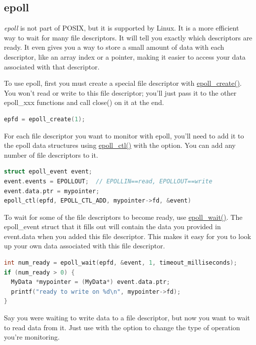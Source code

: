 \subsection{epoll}

\emph{epoll} is not part of POSIX, but it is supported by Linux.
It is a more efficient way to wait for many file descriptors.
It will tell you exactly which descriptors are ready.
It even gives you a way to store a small amount of data with each descriptor, like an array index or a pointer, making it easier to access your data associated with that descriptor.

To use epoll, first you must create a special file descriptor with \href{http://linux.die.net/man/2/epoll_create}{epoll\_create()}.
You won't read or write to this file descriptor; you'll just pass it to the other epoll\_xxx functions and call close() on it at the end.

\begin{lstlisting}[language=C]
    epfd = epoll_create(1);
\end{lstlisting}

For each file descriptor you want to monitor with epoll, you'll need to add it to the epoll data structures using \href{http://linux.die.net/man/2/epoll_ctl}{epoll\_ctl()} with the  option.
You can add any number of file descriptors to it.

\begin{lstlisting}[language=C]
struct epoll_event event;
event.events = EPOLLOUT;  // EPOLLIN==read, EPOLLOUT==write
event.data.ptr = mypointer;
epoll_ctl(epfd, EPOLL_CTL_ADD, mypointer->fd, &event)
\end{lstlisting}

To wait for some of the file descriptors to become ready, use \href{http://linux.die.net/man/2/epoll_wait}{epoll\_wait()}.
The epoll\_event struct that it fills out will contain the data you provided in event.data when you added this file descriptor.
This makes it easy for you to look up your own data associated with this file descriptor.

\begin{lstlisting}[language=C]
int num_ready = epoll_wait(epfd, &event, 1, timeout_milliseconds);
if (num_ready > 0) {
  MyData *mypointer = (MyData*) event.data.ptr;
  printf("ready to write on %d\n", mypointer->fd);
}
\end{lstlisting}

Say you were waiting to write data to a file descriptor, but now you want to wait to read data from it.
Just use  with the  option to change the type of operation you're monitoring.

